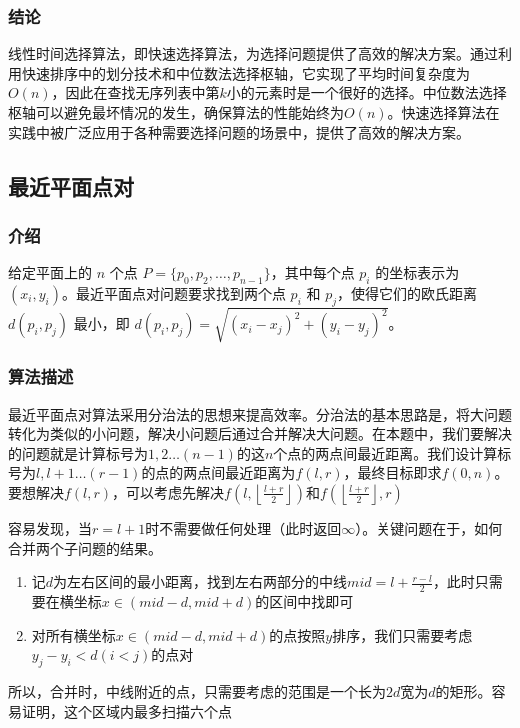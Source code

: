 \documentclass[lang=cn,11pt,a4paper]{elegantpaper}
\begin{document}
\subsubsection{结论}
线性时间选择算法，即快速选择算法，为选择问题提供了高效的解决方案。通过利用快速排序中的划分技术和中位数法选择枢轴，它实现了平均时间复杂度为$O(n)$，因此在查找无序列表中第$k$小的元素时是一个很好的选择。中位数法选择枢轴可以避免最坏情况的发生，确保算法的性能始终为$O(n)$。快速选择算法在实践中被广泛应用于各种需要选择问题的场景中，提供了高效的解决方案。

\subsection{最近平面点对}

\subsubsection{介绍}
给定平面上的 $n$ 个点 $P = \{p_0, p_2, \ldots, p_{n-1}\}$，其中每个点 $p_i$ 的坐标表示为 $(x_i, y_i)$。最近平面点对问题要求找到两个点 $p_i$ 和 $p_j$，使得它们的欧氏距离 $d(p_i, p_j)$ 最小，即 $d(p_i, p_j) = \sqrt{(x_i-x_j)^2 + (y_i-y_j)^2}$。

\subsubsection{算法描述}
最近平面点对算法采用分治法的思想来提高效率。分治法的基本思路是，将大问题转化为类似的小问题，解决小问题后通过合并解决大问题。在本题中，我们要解决的问题就是计算标号为$1,2\dots(n -1)$的这$n$个点的两点间最近距离。我们设计算标号为$l,l+1\dots(r -1)$的点的两点间最近距离为$f(l,r)$，最终目标即求$f(0,n)$。要想解决$f(l,r)$，可以考虑先解决$f(l,\left\lfloor \frac{l+r}{2} \right\rfloor)$和$f(\left\lfloor \frac{l+r}{2} \right\rfloor,r)$

容易发现，当$r=l+1$时不需要做任何处理（此时返回$\infty$）。关键问题在于，如何合并两个子问题的结果。
\begin{enumerate}
    \item 记$d$为左右区间的最小距离，找到左右两部分的中线$mid=l+\frac{r-l}{2}$，此时只需要在横坐标$x\in(mid-d,mid+d)$的区间中找即可
    \item 对所有横坐标$x\in(mid-d,mid+d)$的点按照$y$排序，我们只需要考虑$y_j-y_i<d(i<j)$的点对
\end{enumerate}

所以，合并时，中线附近的点，只需要考虑的范围是一个长为$2d$宽为$d$的矩形。容易证明，这个区域内最多扫描六个点
\end{document}
